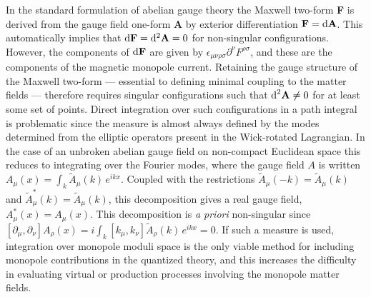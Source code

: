 \documentclass[a4paper,a4paper]{article}
\begin{document}
In the standard formulation of abelian gauge theory the Maxwell two-form {\bf F} is derived from the gauge field one-form {\bf A} by exterior differentiation ${\bf F} = {\rm d}{\bf A}$.  This automatically implies  that ${\rm d}{\bf F} = {\rm d}^2 {\bf A} = 0$ for non-singular configurations.  However, the components of ${\rm d}{\bf F}$ are given by $\epsilon_{\mu \nu \rho \sigma} \partial^\nu F^{\rho \sigma}$, and these are the components of the magnetic monopole current.  Retaining the gauge structure of the Maxwell two-form --- essential to defining minimal coupling to the matter fields --- therefore requires singular configurations such that ${\textrm d}^2 {\bf A} \not = 0$ for at least some set of points.  Direct integration over such configurations in a path integral is problematic since the measure is almost always defined by the modes determined from the elliptic operators present in the Wick-rotated Lagrangian.  In the case of an unbroken abelian gauge field on non-compact Euclidean space this reduces to integrating over the Fourier modes, where the gauge field $A$ is written $A_\mu (x) = \int_k \tilde{A}_\mu (k) \, e^{ikx}$.  Coupled with the restrictions $\tilde{A}_\mu ( -k) = \tilde{A}_\mu (k)$ and $\tilde{A}^*_\mu (k) = \tilde{A}_\mu (k)$, this decomposition gives a real gauge field, $A^*_\mu (x) = A_\mu (x)$. This decomposition is {\it a priori} non-singular since $\left[ \partial_\mu , \partial_\nu \right] A_\rho ( x ) = i \int_k \left[ k_\mu , k_\nu \right] \tilde{A}_\rho (k) \, e^{ikx} = 0$. If such a measure is used, integration over monopole moduli space is the only viable method for including monopole contributions in the quantized theory, and this increases the difficulty in evaluating virtual or production processes involving the monopole matter fields.  
\end{document}

